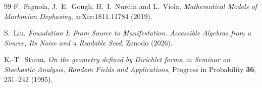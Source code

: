 \documentclass[12pt,a4paper]{article}
\begin{document}
\begin{thebibliography}{99}
F.~Fagnola, J.~E.~Gough, H.~I.~Nurdin and L.~Viola,
\emph{Mathematical Models of Markovian Dephasing},
arXiv:1811.11784 (2019).

S.~Liu, \emph{Foundation I: From Source to Manifestation.
Accessible Algebras from a Source, Its Noise and a Readable Seed}, Zenodo (2026).

K.-T.~Sturm, \emph{On the geometry defined by Dirichlet forms},
in \emph{Seminar on Stochastic Analysis, Random Fields and
Applications}, Progress in Probability \textbf{36},
231--242 (1995).

\end{thebibliography}
\end{document}
